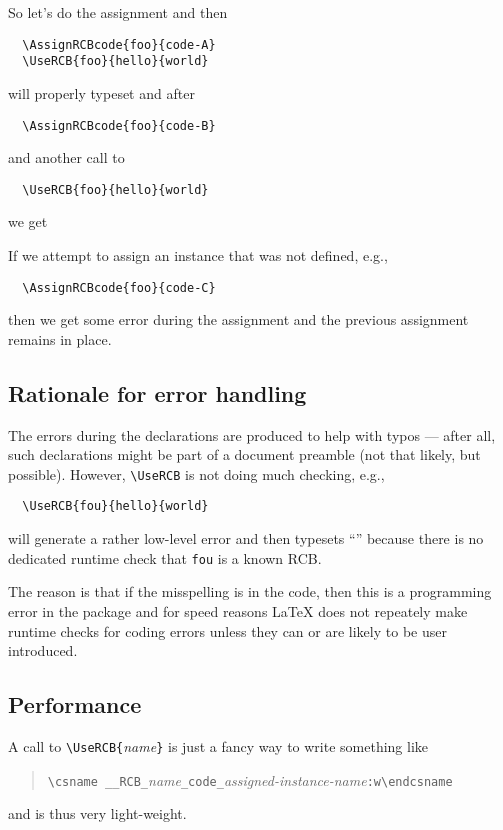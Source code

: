 \documentclass{article}
\newcommand\cs[1]{\texttt{\textbackslash #1}}
\newcommand\meta[1]{\textlangle\textit{#1}\textrangle}
\newcommand\marg[1]{\texttt\{\meta{#1}\texttt\}}
\begin{document}

So let's do the assignment and then
\begin{verbatim}
  \AssignRCBcode{foo}{code-A}
  \UseRCB{foo}{hello}{world}
\end{verbatim}
will properly typeset
and after
\begin{verbatim}
  \AssignRCBcode{foo}{code-B}
\end{verbatim}
and another call to
\begin{verbatim}
  \UseRCB{foo}{hello}{world}
\end{verbatim}
we get

If we attempt to assign an instance that was not defined, e.g.,
\begin{verbatim}
  \AssignRCBcode{foo}{code-C}
\end{verbatim}
then we get some error during the assignment and the previous assignment remains in place.


\subsection{Rationale for error handling}

The errors during the declarations are produced to help
with typos --- after all, such declarations might be part of a document
preamble (not that likely, but possible). However, \cs{UseRCB} is not doing much checking, e.g.,
\begin{verbatim}
  \UseRCB{fou}{hello}{world}
\end{verbatim}
will generate a rather low-level error and then typesets
%
``''
%
because there is no dedicated runtime check that \texttt{fou} is a known RCB.

The reason is that if the misspelling is in the code, then this is a
programming error in the package and for speed reasons \LaTeX{} does
not repeately make runtime checks for coding errors unless they can or
are likely to be user introduced.

\subsection{Performance}

A call to \cs{UseRCB}\marg{name} is just a fancy way to write something like
\begin{quote}
  \verb=\csname __RCB_=\meta{name}\verb=_code_=\meta{assigned-instance-name}\verb=:w\endcsname=
\end{quote}
and is thus very light-weight.
\end{document}
